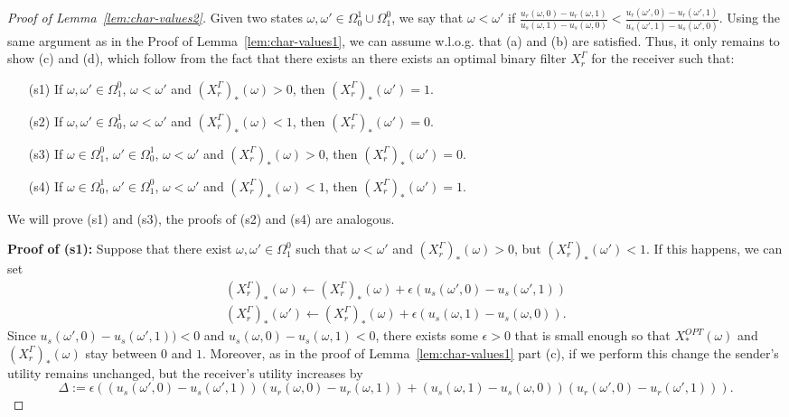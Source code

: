 \documentclass[submission,copyright,creativecommons]{eptcs}
\begin{document}
\begin{proof}[Proof of Lemma~\ref{lem:char-values2}]
Given two states $\omega, \omega' \in \Omega_0^1 \cup \Omega^0_1$, we say that $\omega < \omega'$ if $\frac{u_r(\omega, 0) - u_r(\omega, 1)}{u_s(\omega, 1) - u_s(\omega, 0)} < \frac{u_r(\omega', 0) - u_r(\omega', 1)}{u_s(\omega', 1) - u_s(\omega', 0)}$. Using the same argument as in the Proof of Lemma~\ref{lem:char-values1}, we can assume w.l.o.g. that (a) and (b) are satisfied. Thus, it only remains to show (c) and (d), which follow from the fact that there exists an there exists an optimal binary filter $X_r^\Gamma$ for the receiver such that:
\begin{itemize}
\item[(s1)] If $\omega, \omega' \in \Omega_1^0$, $\omega < \omega'$ and $(X_r^\Gamma)_*(\omega) > 0$, then $(X_r^\Gamma)_*(\omega') = 1$.
\item[(s2)] If $\omega, \omega' \in \Omega_0^1$, $\omega < \omega'$ and $(X_r^\Gamma)_*(\omega) < 1$, then $(X_r^\Gamma)_*(\omega') = 0$.
\item[(s3)] If $\omega \in \Omega_1^0$, $\omega' \in \Omega_0^1$, $\omega < \omega'$ and $(X_r^\Gamma)_*(\omega) > 0$, then $(X_r^\Gamma)_*(\omega') = 0$.
\item[(s4)] If $\omega \in \Omega_0^1$, $\omega' \in \Omega_1^0$, $\omega < \omega'$ and $(X_r^\Gamma)_*(\omega) < 1$, then $(X_r^\Gamma)_*(\omega') = 1$.
\end{itemize}

We will prove (s1) and (s3), the proofs of (s2) and (s4) are analogous. 

\textbf{Proof of (s1):} Suppose that there exist $\omega, \omega' \in \Omega_1^0$ such that $\omega < \omega'$ and $(X_r^\Gamma)_*(\omega) > 0$, but $(X_r^\Gamma)_*(\omega') < 1$. If this happens, we can 
set $$
\begin{array}{l}
(X_r^\Gamma)_*(\omega) \longleftarrow (X_r^\Gamma)_*(\omega) + \epsilon (u_s(\omega', 0) - u_s(\omega', 1)) \\ 
(X_r^\Gamma)_*(\omega') \longleftarrow (X_r^\Gamma)_*(\omega) + \epsilon (u_s(\omega, 1) - u_s(\omega, 0)).
\end{array}$$
Since $u_s(\omega', 0) - u_s(\omega', 1)) < 0$ and $u_s(\omega, 0) - u_s(\omega, 1) < 0$, there exists some $\epsilon > 0$ that is small enough so that $X^{OPT}_*(\omega)$ and $(X_r^\Gamma)_*(\omega)$ stay between $0$ and $1$.
Moreover, as in the proof of Lemma~\ref{lem:char-values1} part (c), if we perform this change the sender's utility remains unchanged, but the receiver's utility increases by $$\Delta := \epsilon((u_s(\omega', 0) - u_s(\omega', 1))(u_r(\omega, 0) - u_r(\omega, 1)) + (u_s(\omega, 1) - u_s(\omega, 0))(u_r(\omega', 0) - u_r(\omega', 1))).$$


\end{proof}
\end{document}
